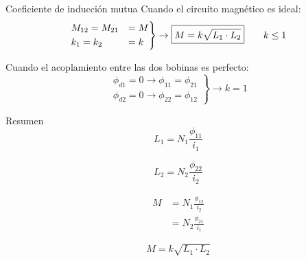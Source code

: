 \documentclass[aspectratio=169, usenames,svgnames,dvipsnames]{beamer}
\begin{document}
\begin{frame}[label={sec:org1e12f05}]{Coeficiente de inducción mutua}
Cuando el circuito magnético es ideal:
\[
  \begin{rcases}
  M_{12} = M_{21} &= M\\
  k_1 = k_2 &= k    
  \end{rcases}
  \rightarrow \boxed{M = k \sqrt{L_1 \cdot L_2}} \qquad  k \leq 1
\]

Cuando el acoplamiento entre las dos bobinas es perfecto:
\[\left.
\begin{array}{cc}
  \phi_{d1} = 0 \rightarrow   \phi_{11} = \phi_{21}\\
  \phi_{d2} = 0 \rightarrow \phi_{22} = \phi_{12} 
  \end{array} \right\} \rightarrow k = 1
\]
\end{frame}

\begin{frame}[label={sec:orgf12a5fe}]{Resumen}
\[
  L_1 = N_1 \frac{\phi_{11}}{i_1}
\]

\[
  L_2 = N_2 \frac{\phi_{22}}{i_2}
\]


\begin{align*}
  M &= N_1 \frac{\phi_{12}}{i_2}\\
    &= N_2 \frac{\phi_{21}}{i_1}
\end{align*}

\[
  M = k \sqrt{L_1 \cdot L_2}
\]
\end{frame}
\end{document}
